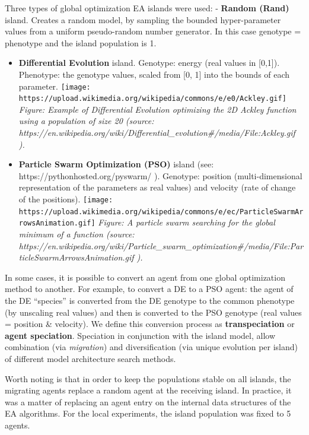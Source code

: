 \documentclass[11pt]{article}
\begin{document}
Three types of global optimization EA islands were used: -
\textbf{Random (Rand)} island. Creates a random model, by sampling the
bounded hyper-parameter values from a uniform pseudo-random number
generator. In this case genotype = phenotype and the island population
is 1.

\begin{itemize}
\item
  \textbf{Differential Evolution} island. Genotype: energy (real values
  in {[}0,1{]}). Phenotype: the genotype values, scaled from {[}0, 1{]}
  into the bounds of each parameter.
  \texttt{[image: https://upload.wikimedia.org/wikipedia/commons/e/e0/Ackley.gif]}
  \emph{Figure: Example of Differential Evolution optimizing the 2D
  Ackley function using a population of size 20 (source:
  https://en.wikipedia.org/wiki/Differential\_evolution\#/media/File:Ackley.gif
  ).}
\item
  \textbf{Particle Swarm Optimization (PSO)} island (see:
  https://pythonhosted.org/pyswarm/ ). Genotype: position
  (multi-dimensional representation of the parameters as real values)
  and velocity (rate of change of the positions).
  \texttt{[image: https://upload.wikimedia.org/wikipedia/commons/e/ec/ParticleSwarmArrowsAnimation.gif]}
  \emph{Figure: A particle swarm searching for the global minimum of a
  function (source:
  https://en.wikipedia.org/wiki/Particle\_swarm\_optimization\#/media/File:ParticleSwarmArrowsAnimation.gif
  ).}
\end{itemize}

In some cases, it is possible to convert an agent from one global
optimization method to another. For example, to convert a DE to a PSO
agent: the agent of the DE ``species'' is converted from the DE genotype
to the common phenotype (by unscaling real values) and then is converted
to the PSO genotype (real values = position \& velocity). We define this
conversion process as \textbf{transpeciation} or \textbf{agent
speciation}. Speciation in conjunction with the island model, allow
combination (via \emph{migration}) and diversification (via unique
evolution per island) of different model architecture search methods.

Worth noting is that in order to keep the populations stable on all
islands, the migrating agents replace a random agent at the receiving
island. In practice, it was a matter of replacing an agent entry on the
internal data structures of the EA algorithms. For the local
experiments, the island population was fixed to 5 agents.
\end{document}
